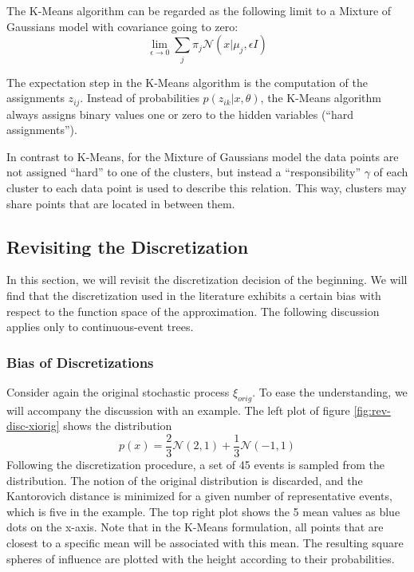 The K-Means algorithm can be regarded as the following limit to a Mixture of Gaussians model with covariance going to zero:
\begin{equation}
  \label{eq:23}
  \lim\limits_{\epsilon\rightarrow 0}\sum_j\pi_j\mathcal{N}(x| \mu_j,\epsilon I)
\end{equation}

The expectation step in the K-Means algorithm is the computation of the assignments $z_{ij}$.
Instead of probabilities $p(z_{ik}|x,\theta)$, the K-Means algorithm always assigns binary values one or zero to the hidden variables (``hard assignments'').

In contrast to K-Means, for the Mixture of Gaussians model the data points are not assigned ``hard'' to one of the clusters, but instead a ``responsibility'' $\gamma$ of each cluster to each data point is used to describe this relation.
This way, clusters may share points that are located in between them.
\subsection{Revisiting the Discretization}
\label{sec:revisiting-discretization}
In this section, we will revisit the discretization decision of the beginning.
We will find that the discretization used in the literature exhibits a certain bias with respect to the function space of the approximation.
The following discussion applies only to continuous-event trees.
\subsubsection{Bias of Discretizations}
Consider again the original stochastic process $\xi_{orig}$.
To ease the understanding, we will accompany the discussion with an example.
The left plot of figure \ref{fig:rev-disc-xiorig} shows the distribution
\begin{equation}
  \label{eq:24}
  p(x) = \frac{2}{3}\mathcal{N}(2,1) + \frac{1}{3}\mathcal{N}(-1,1)
\end{equation}
 Following the discretization procedure, a set of 45 events is sampled from the distribution.
 The notion of the original distribution is discarded, and the Kantorovich distance is minimized for a given number of representative events, which is five in the example.
 The top right plot shows the 5 mean values as blue dots on the x-axis.
 Note that in the K-Means formulation, all points that are closest to a specific mean will be associated with this mean.
 The resulting square spheres of influence are plotted with the height according to their probabilities.

